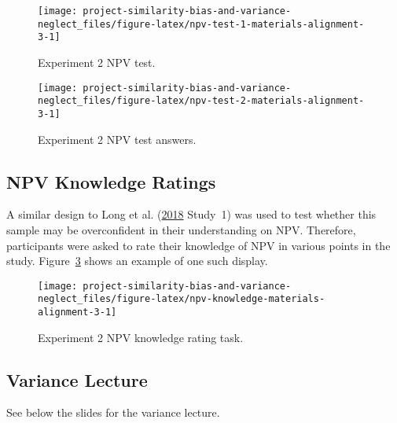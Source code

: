 \documentclass[
  english,
  man, donotrepeattitle,floatsintext]{apa7}
\theoremstyle{definition}
\theoremstyle{definition}
\theoremstyle{definition}
\theoremstyle{definition}
\theoremstyle{remark}
\begin{document}
\begin{figure}
\texttt{[image: project-similarity-bias-and-variance-neglect\_files/figure-latex/npv-test-1-materials-alignment-3-1]} \caption{Experiment 2 NPV test.}\label{fig:npv-test-1-materials-alignment-3}
\end{figure}



\begin{figure}
\texttt{[image: project-similarity-bias-and-variance-neglect\_files/figure-latex/npv-test-2-materials-alignment-3-1]} \caption{Experiment 2 NPV test answers.}\label{fig:npv-test-2-materials-alignment-3}
\end{figure}

\hypertarget{npv-knowledge-materials-alignment-3}{%
\subsection{NPV Knowledge Ratings}\label{npv-knowledge-materials-alignment-3}}

A similar design to Long et al. (\protect\hyperlink{ref-long2018}{2018} Study~1) was used to test whether this sample may
be overconfident in their understanding on NPV. Therefore, participants were
asked to rate their knowledge of NPV in various points in the study.
Figure~\ref{fig:npv-knowledge-materials-alignment-3} shows an example of one
such display.



\begin{figure}
\texttt{[image: project-similarity-bias-and-variance-neglect\_files/figure-latex/npv-knowledge-materials-alignment-3-1]} \caption{Experiment 2 NPV knowledge rating task.}\label{fig:npv-knowledge-materials-alignment-3}
\end{figure}

\newpage
\newpage

\hypertarget{variance-lecture-materials-alignment-3}{%
\subsection{Variance Lecture}\label{variance-lecture-materials-alignment-3}}

See below the slides for the variance lecture.
\end{document}
